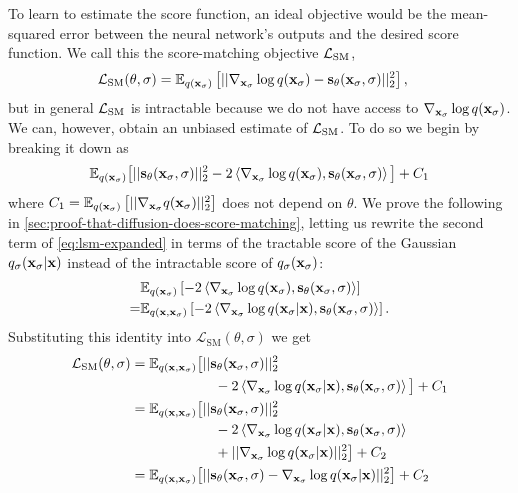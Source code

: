 To learn to estimate the score function, an ideal objective would be the mean-squared error between the neural network's outputs and the desired score function. We call this the score-matching objective ${\mathcal{L}}_\text{SM}$,
\begin{align}
    \mathcal{L}_\text{SM}(\theta, \sigma) &= \mathbb{E}_{q({\mathbf{x}}_\sigma)} \left[ || \nabla_{{\mathbf{x}}_\sigma} \log q({\mathbf{x}}_\sigma) - {\mathbf{s}}_\theta({\mathbf{x}}_\sigma, \sigma) ||_2^2 \right],
\end{align}
but in general ${\mathcal{L}}_\text{SM}$ is intractable because we do not have access to $\nabla_{{\mathbf{x}}_\sigma} \log q({\mathbf{x}}_\sigma)$. We can, however, obtain an unbiased estimate of ${\mathcal{L}}_\text{SM}$. To do so we begin by breaking it down as
\begin{align} \label{eq:lsm-expanded}
    \mathbb{E}_{q({\mathbf{x}}_\sigma)} \big[ 
    || {\mathbf{s}}_\theta({\mathbf{x}}_\sigma, \sigma) ||_2^2
    - 2 \left\langle \nabla_{{\mathbf{x}}_\sigma} \log q({\mathbf{x}}_\sigma),
    {\mathbf{s}}_\theta({\mathbf{x}}_\sigma, \sigma) \right\rangle \big]
    + C_1
\end{align}
where $C_1 = \mathbb{E}_{q({\mathbf{x}}_\sigma)} \left[ || \nabla_{{\mathbf{x}}_\sigma} q({\mathbf{x}}_\sigma) ||_2^2 \right]$ does not depend on $\theta$. We prove the following in \cref{sec:proof-that-diffusion-does-score-matching}, letting us rewrite the second term of \cref{eq:lsm-expanded} in terms of the tractable score of the Gaussian $q_{\sigma}({\mathbf{x}}_\sigma|{\mathbf{x}})$ instead of the intractable score of $q_{\sigma}({\mathbf{x}}_\sigma)$:
\begin{align}
\allowdisplaybreaks
    &\EX_{q(\rvx_\sigma)} \left[ - 2 \left\langle \nabla_{\rvx_\sigma} \log q(\rvx_\sigma), \rvs_\theta(\rvx_\sigma, \sigma) \right\rangle \right] \nonumber \\
    =& \EX_{q(\rvx, \rvx_\sigma)} \left[ -2 \left\langle \nabla_{\rvx_\sigma} \log q(\rvx_\sigma|\rvx), \rvs_\theta(\rvx_\sigma, \sigma) \right\rangle  \right].
\end{align}
Substituting this identity into $\mathcal{L}_\text{SM}(\theta, \sigma)$ we get
\begin{align}
    \mathcal{L}_\text{SM}(\theta, \sigma) &= \mathbb{E}_{q({\mathbf{x}}, {\mathbf{x}}_\sigma)} \big[ 
    || {\mathbf{s}}_\theta({\mathbf{x}}_\sigma, \sigma) ||_2^2
    \nonumber\\ &\qquad\qquad\qquad
    - 2 \left\langle \nabla_{{\mathbf{x}}_\sigma} \log q({\mathbf{x}}_\sigma|{\mathbf{x}}), {\mathbf{s}}_\theta({\mathbf{x}}_\sigma, \sigma) \right\rangle \big] + C_1 \\
    &= \mathbb{E}_{q({\mathbf{x}}, {\mathbf{x}}_\sigma)} \big[ 
    || {\mathbf{s}}_\theta({\mathbf{x}}_\sigma, \sigma) ||_2^2
    \nonumber\\ &\qquad\qquad\qquad
    - 2 \left\langle \nabla_{{\mathbf{x}}_\sigma} \log q({\mathbf{x}}_\sigma|{\mathbf{x}}), {\mathbf{s}}_\theta({\mathbf{x}}_\sigma, \sigma) \right\rangle
    \nonumber\\ &\qquad\qquad\qquad
    + || \nabla_{{\mathbf{x}}_\sigma} \log q({\mathbf{x}}_\sigma|{\mathbf{x}}) ||_2^2 \big] + C_2 \\
    &= \mathbb{E}_{q({\mathbf{x}}, {\mathbf{x}}_\sigma)} \big[ 
    || {\mathbf{s}}_\theta({\mathbf{x}}_\sigma, \sigma) - \nabla_{{\mathbf{x}}_\sigma} \log q({\mathbf{x}}_\sigma|{\mathbf{x}}) ||_2^2 \big] + C_2
\end{align}

